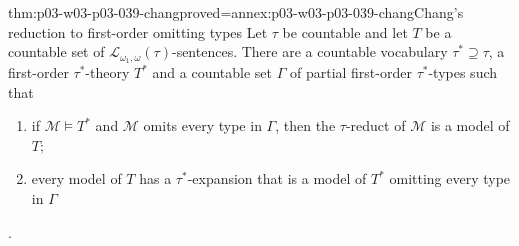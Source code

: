 \begin{hbtheorem}{thm:p03-w03-p03-039-chang}{proved=annex:p03-w03-p03-039-chang}{Chang's reduction to first-order omitting types}
Let \(\tau\) be countable and let \(T\) be a countable set of
\(\mathcal L_{\omega_1,\omega}(\tau)\)-sentences. There are a countable
vocabulary \(\tau^*\supseteq\tau\), a first-order \(\tau^*\)-theory \(T^*\) and
a countable set \(\Gamma\) of partial first-order \(\tau^*\)-types such that
\begin{enumerate}
\item if \(\mathcal M\models T^*\) and \(\mathcal M\) omits every type in
      \(\Gamma\), then the \(\tau\)-reduct of \(\mathcal M\) is a model of \(T\);
\item every model of \(T\) has a \(\tau^*\)-expansion that is a model of \(T^*\)
      omitting every type in \(\Gamma\)
\end{enumerate}
\cite[Thm.~1.31 and Ex.~1.32, pp.~11--12]{Marker2014InfinitaryNotes}.
\end{hbtheorem}

